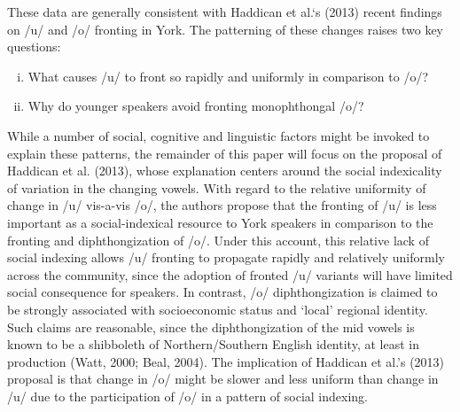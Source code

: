 \documentclass[PWPL]{article}
\begin{document}

These data are generally consistent with Haddican et al.`s (2013) recent findings on /u/ and /o/ fronting in York. The patterning of these changes raises two key questions:

\begin{enumerate}[i)]
\item{What causes /u/ to front so rapidly and uniformly in comparison to /o/?}
\item{Why do younger speakers avoid fronting monophthongal /o/?}
\end{enumerate}

While a number of social, cognitive and linguistic factors might be invoked to explain these patterns, the remainder of this paper will focus on the proposal of Haddican et al. (2013), whose explanation centers around the social indexicality of variation in the changing vowels.  With regard to the relative uniformity of change in /u/ vis-a-vis /o/, the authors propose that the fronting of /u/ is less important as a social-indexical resource to York speakers in comparison to the fronting and diphthongization of /o/. Under this account, this relative lack of social indexing allows /u/ fronting to propagate rapidly and relatively uniformly across the community, since the adoption of fronted /u/ variants will have limited social consequence for speakers. In contrast, /o/ diphthongization is claimed to be strongly associated with socioeconomic status and `local' regional identity. Such claims are reasonable, since the diphthongization of the mid vowels is known to be a shibboleth of Northern/Southern English identity, at least in production (Watt, 2000; Beal, 2004). The implication of Haddican et al.'s (2013) proposal is that change in /o/ might be slower and less uniform than change in /u/ due to the participation of /o/ in a pattern of social indexing. 
\end{document}
